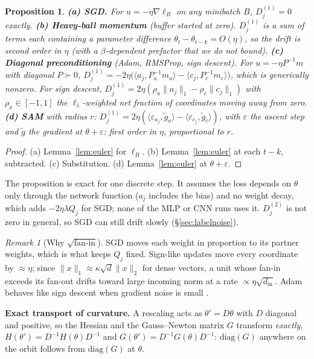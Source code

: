 \documentclass[10pt,twocolumn]{article}
\newtheorem{proposition}{Proposition}
\theoremstyle{remark}
\newtheorem{remark}{Remark}
\begin{document}
\begin{proposition}\label{prop:drift}
\textbf{(a) SGD.} For $u=-\eta\nabla\ell_B$ on any minibatch $B$, $D^{(1)}_j=0$ exactly.
\textbf{(b) Heavy-ball momentum} (buffer started at zero). $D^{(1)}_j$ is a sum of terms each containing a parameter difference $\theta_t-\theta_{t-k}=O(\eta)$, so the drift is second order in $\eta$ (with a $\beta$-dependent prefactor that we do not bound).
\textbf{(c) Diagonal preconditioning} (Adam, RMSProp, sign descent). For $u=-\eta P^{-1}m$ with diagonal $P\succ0$, $D^{(1)}_j=-2\eta\big(\langle a_j,P_a^{-1}m_a\rangle-\langle c_j,P_c^{-1}m_c\rangle\big)$, which is generically nonzero. For sign descent, $D^{(1)}_j=2\eta(\rho_a\|a_j\|_1-\rho_c\|c_j\|_1)$ with $\rho_x\in[-1,1]$ the $\ell_1$-weighted net fraction of coordinates moving away from zero.
\textbf{(d) SAM} with radius $r$: $D^{(1)}_j=2\eta(\langle\varepsilon_{a_j},\tilde g_a\rangle-\langle\varepsilon_{c_j},\tilde g_c\rangle)$, with $\varepsilon$ the ascent step and $\tilde g$ the gradient at $\theta+\varepsilon$: first order in $\eta$, proportional to $r$.
\end{proposition}
\begin{proof}
(a) Lemma~\ref{lem:euler} for $\ell_B$. (b) Lemma~\ref{lem:euler} at each $t-k$, subtracted. (c) Substitution. (d) Lemma~\ref{lem:euler} at $\theta+\varepsilon$.
\end{proof}
The proposition is exact for one discrete step. It assumes the loss depends on $\theta$ only through the network function ($a_j$ includes the bias) and no weight decay, which adds $-2\eta\lambda Q_j$ for SGD; none of the MLP or CNN runs uses it. $D^{(2)}_j$ is not zero in general, so SGD can still drift slowly (\S\ref{sec:labelnoise}).

\begin{remark}[Why $\sqrt{\text{fan-in}}$]\label{rem:fanin}
SGD moves each weight in proportion to its partner weights, which is what keeps $Q_j$ fixed. Sign-like updates move every coordinate by $\approx\eta$; since $\|x\|_1\approx\kappa\sqrt{d}\|x\|_2$ for dense vectors, a unit whose fan-in exceeds its fan-out drifts toward large incoming norm at a rate $\propto\eta\sqrt{d_{\mathrm{in}}}$. Adam behaves like sign descent when gradient noise is small \citep{balles2018dissecting,bernstein2018signsgd}.
\end{remark}

\textbf{Exact transport of curvature.} A rescaling acts as $\theta'=D\theta$ with $D$ diagonal and positive, so the Hessian and the Gauss--Newton matrix $G$ transform \emph{exactly}, $H(\theta')=D^{-1}H(\theta)D^{-1}$ and $G(\theta')=D^{-1}G(\theta)D^{-1}$: $\mathrm{diag}(G)$ anywhere on the orbit follows from $\mathrm{diag}(G)$ at $\theta$.
\end{document}

